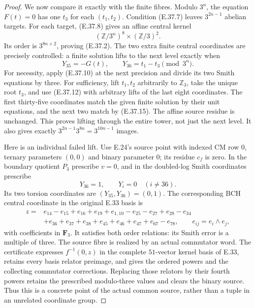 \begin{proof}
We now compare it exactly with the finite fibres.
Modulo $3^n$, the equation $F(t)=0$ has one
$t_3$ for each $(t_1,t_2)$.
Condition \textup{(E.37.7)} leaves
$3^{2n-1}$ abelian targets.
For each target, \textup{(E.37.8)} gives
an affine central kernel
\[
       (\mathbb Z/3^n)^8\times(\mathbb Z/3)^2.
 \tag{E.37.14}
\]
Its order is $3^{8n+2}$, proving
\textup{(E.37.2)}.
The two extra finite central coordinates are
precisely controlled: a finite solution lifts
to the next level exactly when
\[
          Y_{35}=-G(t),\qquad
          Y_{36}=t_1-t_3\pmod{3^n}.
 \tag{E.37.15}
\]
For necessity, apply
\textup{(E.37.10)} at the next precision and
divide its two Smith equations by three.
For sufficiency, lift $t_1,t_2$ arbitrarily
to $\mathbb Z_3$, take the unique root $t_3$,
and use \textup{(E.37.12)} with arbitrary lifts
of the last eight coordinates.
The first thirty-five coordinates match the
given finite solution by their unit equations,
and the next two match by
\textup{(E.37.15)}.
The affine source residue is unchanged.
This proves lifting through the entire tower,
not just the next level.
It also gives exactly
$3^{2n-1}3^{8n}=3^{10n-1}$ images.

Here is an individual failed lift.  Use E.24's
source point with indexed CM row $0$, ternary
parameters $(0,0)$ and binary parameter $0$;
its residue $c_f$ is zero.
In the boundary quotient $P_3$ prescribe
$v=0$, and in the doubled-log Smith coordinates
prescribe
\[
           Y_{36}=1,\qquad Y_i=0\quad(i\ne36).
 \tag{E.37.16}
\]
Its two torsion coordinates are $(Y_{35},Y_{36})=(0,1)$.
The corresponding BCH central coordinate in the
original E.33 basis is
\[
 \begin{split}
 z={}&e_{14}-e_{15}+e_{16}+e_{19}+e_{1,10}
       -e_{25}-e_{27}+e_{28}-e_{34}\\
    &+e_{36}+e_{37}+e_{38}
       +e_{45}+e_{46}+e_{47}+e_{67}-e_{78},
       \qquad e_{ij}=e_i\wedge e_j,
 \end{split}
 \tag{E.37.17}
\]
with coefficients in $\mathbf F_3$.
It satisfies both order relations: its Smith
error is a multiple of three.
The source fibre is realized by an actual
commutator word.  The certificate expresses
$f^{-1}(0,z)$ in the complete $51$-vector
kernel basis of E.33, retains every basis
relator preimage, and gives the ordered powers
and the collecting commutator corrections.
Replacing those relators by their fourth
powers retains the prescribed modulo-three
values and clears the binary source.
Thus this is a concrete point of the actual
common source, rather than a tuple in an
unrelated coordinate group.


\end{proof}
